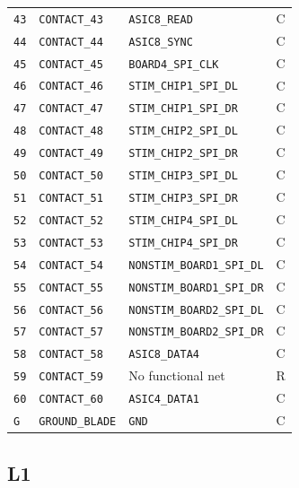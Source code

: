 \documentclass[10pt,a4paper]{article}
\begin{document}
\begin{longtable}{@{}P{15mm}P{42mm}P{92mm}P{10mm}@{}}
\nolinkurl{43} & \nolinkurl{CONTACT_43} & \nolinkurl{ASIC8_READ} & C \\
\nolinkurl{44} & \nolinkurl{CONTACT_44} & \nolinkurl{ASIC8_SYNC} & C \\
\nolinkurl{45} & \nolinkurl{CONTACT_45} & \nolinkurl{BOARD4_SPI_CLK} & C \\
\nolinkurl{46} & \nolinkurl{CONTACT_46} & \nolinkurl{STIM_CHIP1_SPI_DL} & C \\
\nolinkurl{47} & \nolinkurl{CONTACT_47} & \nolinkurl{STIM_CHIP1_SPI_DR} & C \\
\nolinkurl{48} & \nolinkurl{CONTACT_48} & \nolinkurl{STIM_CHIP2_SPI_DL} & C \\
\nolinkurl{49} & \nolinkurl{CONTACT_49} & \nolinkurl{STIM_CHIP2_SPI_DR} & C \\
\nolinkurl{50} & \nolinkurl{CONTACT_50} & \nolinkurl{STIM_CHIP3_SPI_DL} & C \\
\nolinkurl{51} & \nolinkurl{CONTACT_51} & \nolinkurl{STIM_CHIP3_SPI_DR} & C \\
\nolinkurl{52} & \nolinkurl{CONTACT_52} & \nolinkurl{STIM_CHIP4_SPI_DL} & C \\
\nolinkurl{53} & \nolinkurl{CONTACT_53} & \nolinkurl{STIM_CHIP4_SPI_DR} & C \\
\nolinkurl{54} & \nolinkurl{CONTACT_54} & \nolinkurl{NONSTIM_BOARD1_SPI_DL} & C \\
\nolinkurl{55} & \nolinkurl{CONTACT_55} & \nolinkurl{NONSTIM_BOARD1_SPI_DR} & C \\
\nolinkurl{56} & \nolinkurl{CONTACT_56} & \nolinkurl{NONSTIM_BOARD2_SPI_DL} & C \\
\nolinkurl{57} & \nolinkurl{CONTACT_57} & \nolinkurl{NONSTIM_BOARD2_SPI_DR} & C \\
\nolinkurl{58} & \nolinkurl{CONTACT_58} & \nolinkurl{ASIC8_DATA4} & C \\
\nolinkurl{59} & \nolinkurl{CONTACT_59} & No functional net & R \\
\nolinkurl{60} & \nolinkurl{CONTACT_60} & \nolinkurl{ASIC4_DATA1} & C \\
\nolinkurl{G} & \nolinkurl{GROUND_BLADE} & \nolinkurl{GND} & C \\
\end{longtable}\endgroup

\Needspace{32mm}\subsection*{L1}
\end{document}
